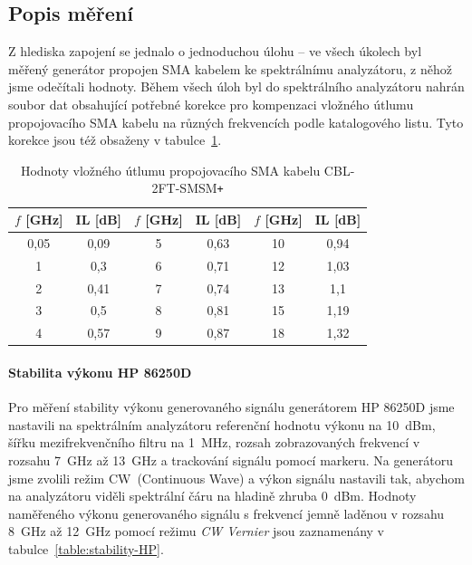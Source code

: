 \documentclass[11pt,a4paper]{article}
\newcommand{\plus}{{\texttt{+}}}
\begin{document}
\subsection*{Popis měření}
Z hlediska zapojení se jednalo o jednoduchou úlohu -- ve všech úkolech byl měřený generátor propojen SMA kabelem ke spektrálnímu analyzátoru, z něhož jsme odečítali hodnoty. Během všech úloh byl do spektrálního analyzátoru nahrán soubor dat obsahující potřebné korekce pro kompenzaci vložného útlumu propojovacího SMA kabelu na různých frekvencích podle katalogového listu. Tyto korekce jsou též obsaženy v tabulce~\ref{table:cable-CBL2FTSMSM-insertion-loss}.

\begin{table}[!ht]
\begin{center}
\begin{tabular}{| c | c || c | c || c | c |}
    \hline
    $f$ [GHz] & IL [dB] & $f$ [GHz] & IL [dB] & $f$ [GHz] & IL [dB] \\
    \hline
    0,05 & 0,09 & 5 & 0,63 & 10 & 0,94 \\
    \hline
    1 & 0,3 & 6 & 0,71 & 12 & 1,03 \\
    \hline
    2 & 0,41 & 7 & 0,74 & 13 & 1,1 \\
    \hline
    3 & 0,5 & 8 & 0,81 & 15 & 1,19 \\
    \hline
    4 & 0,57 & 9 & 0,87 & 18 & 1,32 \\
    \hline
\end{tabular}
\caption{Hodnoty vložného útlumu propojovacího SMA kabelu CBL-2FT-SMSM\plus}
\label{table:cable-CBL2FTSMSM-insertion-loss}
\end{center}
\end{table}

\paragraph*{Stabilita výkonu HP 86250D} Pro měření stability výkonu generovaného signálu generátorem HP 86250D jsme nastavili na spektrálním analyzátoru referenční hodnotu výkonu na 10~dBm, šířku mezifrekvenčního filtru na 1~MHz, rozsah zobrazovaných frekvencí v rozsahu 7~GHz až 13~GHz a trackování signálu pomocí markeru. Na generátoru jsme zvolili režim CW~(Continuous Wave) a výkon signálu nastavili tak, abychom na analyzátoru viděli spektrální čáru na hladině zhruba 0~dBm. Hodnoty naměřeného výkonu generovaného signálu s frekvencí jemně laděnou v rozsahu 8~GHz až 12~GHz pomocí režimu \emph{CW Vernier} jsou zaznamenány v tabulce~\ref{table:stability-HP}.
\end{document}
